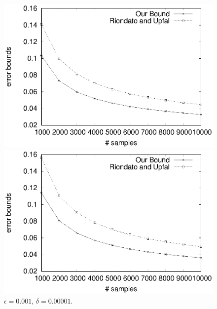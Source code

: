 \documentclass{article}
\begin{document}
\begin{figure}[!t]
\centering
\begin{minipage}{.45\textwidth}
\includegraphics[width=\textwidth]{e01d0001.eps}
\caption{$\epsilon = 0.01$, $\delta = 0.0001$.}
\label{fig:b1}
\end{minipage}
\hspace{5pt}
\begin{minipage}{.45\textwidth}
\includegraphics[width=\textwidth]{e001d00001.eps}
\caption{$\epsilon = 0.001$, $\delta = 0.00001$.}
\label{fig:b2}
\end{minipage}
\end{figure}
\end{document}
